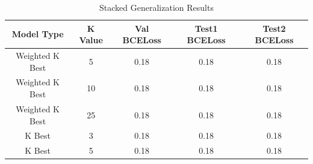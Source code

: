 \begin{table}[t]
\caption{ Stacked Generalization Results}
\vspace{0.1 in}
\centering
\resizebox{3.3in}{!}
{%
\begin{tabular}{|c|c|c|c|c|}
\hline
{\bf Model Type} & {\bf K Value} & {\bf Val BCELoss} & {\bf Test1 BCELoss} & {\bf Test2 BCELoss} \\  \hline
Weighted K Best	  		&  5 &  0.18 &  0.18 &  0.18  \\ \hline
Weighted K Best	  		&  10 &  0.18 &  0.18 &  0.18  \\ \hline
Weighted K Best	  		&  25 &  0.18 &  0.18 &  0.18  \\ \hline
K Best	  		&  3 &  0.18 &  0.18 &  0.18  \\ \hline
K Best	  		&  5 &  0.18 &  0.18 &  0.18  \\ \hline
\end{tabular}
}
\label{tab:stacking}
\end{table}